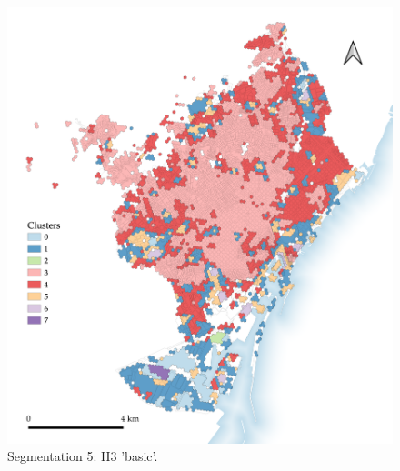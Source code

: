 \documentclass[a4paper, nobind]{templates/ociamthesis}
\begin{document}
\begin{figure}

{\centering \includegraphics[width=.8\paperwidth]{figures/maps/H3_basic 1} 

}

\caption[Segmentation 5: H3 'basic'.]{Segmentation 5: H3 'basic'.}\label{fig:H3-basic-map-BCN}
\end{figure}
\end{document}

